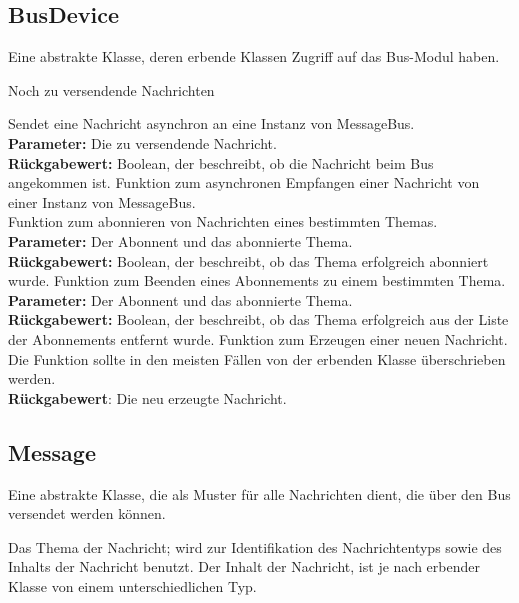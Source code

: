 \documentclass[entwurf.tex]{subfiles}
\begin{document}
	\subsection{BusDevice}
	\label{Class:BusDevice} 
		Eine abstrakte Klasse, deren erbende Klassen Zugriff auf das Bus-Modul haben.
		\begin{description}
				Noch zu versendende Nachrichten
			
				Sendet eine Nachricht asynchron an eine Instanz von MessageBus.\\ 
				\textbf{Parameter:} Die zu versendende Nachricht.\\ 
				\textbf{Rückgabewert:} Boolean, der beschreibt, ob die Nachricht beim Bus angekommen ist.
				Funktion zum asynchronen Empfangen einer Nachricht von einer Instanz von MessageBus.\\ 
				Funktion zum abonnieren von Nachrichten eines bestimmten Themas.\\ 
				\textbf{Parameter:} Der Abonnent und das abonnierte Thema.\\ 
				\textbf{Rückgabewert:} Boolean, der beschreibt, ob das Thema erfolgreich abonniert wurde.
				Funktion zum Beenden eines Abonnements zu einem bestimmten Thema.\\ 
				\textbf{Parameter:} Der Abonnent und das abonnierte Thema.\\ 
				\textbf{Rückgabewert:} Boolean, der beschreibt, ob das Thema erfolgreich aus der Liste der Abonnements entfernt wurde.
				Funktion zum Erzeugen einer neuen Nachricht. Die Funktion sollte in den meisten Fällen von der erbenden Klasse überschrieben werden. \\
				\textbf{Rückgabewert}: Die neu erzeugte Nachricht.
		\end{description}
  		
	\subsection{Message}
	\label{Class:Message} 
		Eine abstrakte Klasse, die als Muster für alle Nachrichten dient, die über den Bus versendet werden können.
		\begin{description}
			\attr{protected topic: Topic}  
				Das Thema der Nachricht; wird zur Identifikation des Nachrichtentyps sowie des Inhalts der Nachricht benutzt.
			\attr{Inhalt}
				Der Inhalt der Nachricht, ist je nach erbender Klasse von einem unterschiedlichen Typ.
		\end{description}
\end{document}
